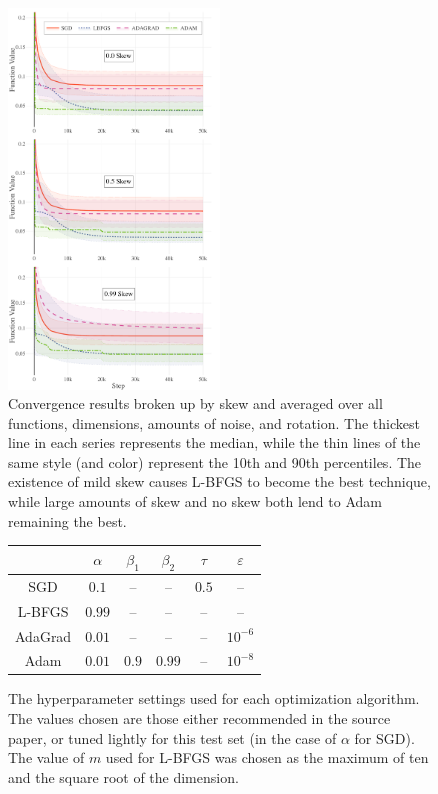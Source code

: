 \documentclass[conference]{ieeeconf}  %
\begin{document}
\begin{figure}
  \centering
  \includegraphics[width=0.5\textwidth]{Figures/final-skew}
  \caption{Convergence results broken up by skew and averaged over all
    functions, dimensions, amounts of noise, and rotation. The
    thickest line in each series represents the median, while the thin
    lines of the same style (and color) represent the 10th and 90th
    percentiles. The existence of mild skew causes L-BFGS to become
    the best technique, while large amounts of skew and no skew both
    lend to Adam remaining the best.}
  \label{fig:results-skew}
  \vspace{1.2cm}
\end{figure}

\begin{figure}
  \centering
  \begin{tabular}{|c|c|c|c|c|c|}
    \hline
    & $\alpha$ & $\beta_1$ & $\beta_2$ & $\tau$ & $\varepsilon$ \\
    \hline
    SGD     & $0.1$  & -- & -- & $0.5$ & -- \\
    L-BFGS & $0.99$ & -- & -- & -- & -- \\
    AdaGrad & $0.01$ & -- & -- & -- & $10^{-6}$ \\
    Adam    & $0.01$ & $0.9$ & $0.99$ & -- & $10^{-8}$ \\
    \hline
  \end{tabular}
  \caption{The hyperparameter settings used for each optimization
    algorithm. The values chosen are those either recommended in the
    source paper, or tuned lightly for this test set (in the case of
    $\alpha$ for SGD). The value of $m$ used for L-BFGS was chosen as
    the maximum of ten and the square root of the dimension.}
  \label{tab:hypeparam}
  \vspace{0.4cm}
\end{figure}
\end{document}
